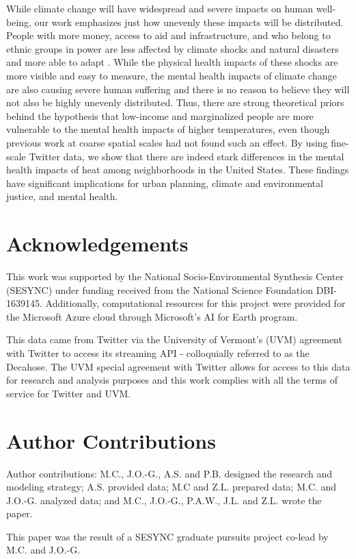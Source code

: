 \documentclass[titlepage]{article}
\begin{document}
While climate change will have widespread and severe impacts on human well-being, our work emphasizes just how unevenly these impacts will be distributed. People with more money, access to aid and infrastructure, and who belong to ethnic groups in power are less affected by climate shocks and natural disasters and more able to adapt \citep{bullard2012wrong}. While the physical health impacts of these shocks are more visible and easy to measure, the mental health impacts of climate change are also causing severe human suffering and there is no reason to believe they will not also be highly unevenly distributed. Thus, there are strong theoretical priors behind the hypothesis that low-income and marginalized people are more vulnerable to the mental health impacts of higher temperatures, even though previous work at coarse spatial scales had not found such an effect. By using fine-scale Twitter data, we show that there are indeed stark differences in the mental health impacts of heat among neighborhoods in the United States. These findings have significant implications for urban planning, climate and environmental justice, and mental health.

\section*{Acknowledgements}
This work was supported by the National Socio-Environmental Synthesis Center (SESYNC) under funding received from the National Science Foundation DBI-1639145. Additionally, computational resources for this project were provided for the Microsoft Azure cloud through Microsoft's AI for Earth program.

This data came from Twitter via the University of Vermont’s (UVM) agreement with Twitter to access its streaming API - colloquially referred to as the Decahose. The UVM special agreement with Twitter allows for access to this data for research and analysis purposes and this work complies with all the terms of service for Twitter and UVM. 


\section*{Author Contributions}
Author contributions: M.C., J.O.-G., A.S. and P.B. designed the research and modeling strategy; A.S. provided data; M.C and Z.L. prepared data; M.C. and J.O.-G. analyzed data; and M.C., J.O.-G., P.A.W., J.L. and Z.L. wrote the paper.

\noindent This paper was the result of a SESYNC graduate pursuits project co-lead by M.C. and J.O.-G.

\printbibliography
\end{document}
